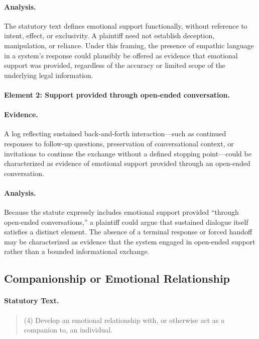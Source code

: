 \documentclass[11pt]{article}
\begin{document}
\paragraph{Analysis.}
The statutory text defines emotional support functionally, without reference to intent, effect,
or exclusivity. A plaintiff need not establish deception, manipulation, or reliance. Under
this framing, the presence of empathic language in a system’s response could plausibly be
offered as evidence that emotional support was provided, regardless of the accuracy or
limited scope of the underlying legal information.

\paragraph{Element 2: Support provided through open-ended conversation.}

\paragraph{Evidence.}
A log reflecting sustained back-and-forth interaction—such as continued responses to
follow-up questions, preservation of conversational context, or invitations to continue the
exchange without a defined stopping point—could be characterized as evidence of emotional
support provided through an open-ended conversation.

\paragraph{Analysis.}
Because the statute expressly includes emotional support provided “through open-ended
conversations,” a plaintiff could argue that sustained dialogue itself satisfies a distinct
element. The absence of a terminal response or forced handoff may be characterized as evidence
that the system engaged in open-ended support rather than a bounded informational exchange.

\subsection{Companionship or Emotional Relationship}

\paragraph{Statutory Text.}
\begin{quote}
(4) Develop an emotional relationship with, or otherwise act as a companion to, an individual.
\end{quote}
\end{document}
